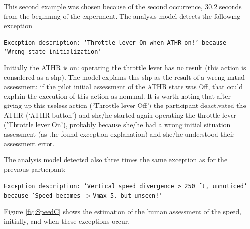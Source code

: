 



This second example was chosen because of the second occurrence, 
$30.2$ seconds from the beginning of the experiment.
The analysis model detects the following exception:
\begin{description}
\item \texttt{Exception description: `Throttle lever On when ATHR on!' because 'Wrong state initialization'}
\end{description}
Initially the ATHR is on: operating the throttle lever has no result 
(this action is considered as a slip). 
The model explains this slip as the result of a wrong initial assessment: 
if the pilot initial assessment of the ATHR state was Off, 
that could explain the execution of this action as nominal. 
It is worth noting that after giving up this useless action (`Throttle lever Off') 
the participant deactivated the ATHR (`ATHR button') 
and she/he started again operating the throttle lever ('Throttle lever On'), 
probably because she/he had a wrong initial situation assessment 
(as the found exception explanation) and she/he understood their assessment error. 

The analysis model detected also three times the same exception as for the previous participant:
\begin{description}
\item \texttt{Exception description: `Vertical speed divergence $>$ 250 ft, unnoticed' because 'Speed becomes $>$Vmax-5, but unseen!'}
\end{description}
Figure \ref{fig:SpeedC} shows the estimation of the human assessment 
of the speed, initially, and when these exceptions occur.


